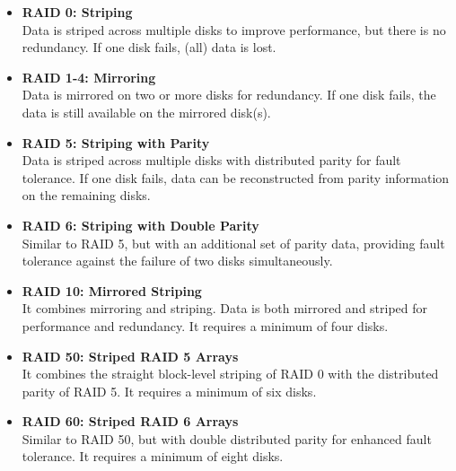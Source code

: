 \begin{itemize}[left=0pt, align=left]

   \item \textbf{RAID 0: Striping}\\
      Data is striped across multiple disks to improve performance, but there is no redundancy. If one disk fails, (all) data is lost.

   \item \textbf{RAID 1-4: Mirroring}\\
      Data is mirrored on two or more disks for redundancy. If one disk fails, the data is still available on the mirrored disk(s).

   \item \textbf{RAID 5: Striping with Parity}\\
      Data is striped across multiple disks with distributed parity for fault tolerance. If one disk fails, data can be reconstructed from parity information on the remaining disks.

   \item \textbf{RAID 6: Striping with Double Parity}\\
      Similar to RAID 5, but with an additional set of parity data, providing fault tolerance against the failure of two disks simultaneously.

   \item \textbf{RAID 10: Mirrored Striping}\\
      It combines mirroring and striping. Data is both mirrored and striped for performance and redundancy. It requires a minimum of four disks.

   \item \textbf{RAID 50: Striped RAID 5 Arrays}\\
      It combines the straight block-level striping of RAID 0 with the distributed parity of RAID 5. It requires a minimum of six disks.

   \item \textbf{RAID 60: Striped RAID 6 Arrays}\\
      Similar to RAID 50, but with double distributed parity for enhanced fault tolerance. It requires a minimum of eight disks.

\end{itemize}

